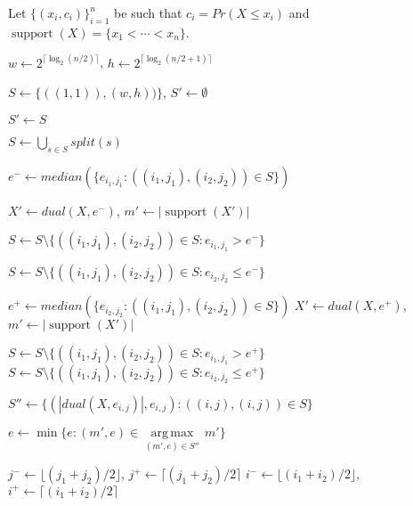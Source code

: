 \documentclass[letterpaper]{article} %
\DeclareMathOperator{\supp}{support}
\begin{document}
\begin{algorithm}
		\DontPrintSemicolon
		Let $\{(x_i, c_i)\}_{i=1}^n$ be such that $c_i=Pr(X \leq x_i)$ and $\supp(X)=\{x_1 < \cdots < x_n\}$.\;
		
		$w \gets 2^{\lceil \log_2(n/2) \rceil}$,
		$h \gets 2^{\lceil \log_2(n/2+1) \rceil}$ \;
				
		$S \gets  \{ ((1, 1)),(w,h)) \}$, $S' \gets \emptyset$\;
		
		
		{
			$S' \gets S$\;

			$S \gets \displaystyle \bigcup_{s \in S} split(s)$\;
			
			$e^- {\gets} median(\{ e_{i_1,j_1} \colon ((i_1,j_1),(i_2,j_2)) \in S \}) $\;		
			
			$X' \gets dual(X,e^-)$, $m' \gets |\supp(X')|$\;

			 {
				$S \gets S \setminus \{ ((i_1,j_1),(i_2,j_2)) {\in} S \colon e_{i_1,j_1} {>} e^- \}$ \;
			}
			
			\Else %
			{
				$S \gets S \setminus \{ ((i_1,j_1),(i_2,j_2)) {\in} S \colon e_{i_2,j_2} {\leq} e^- \}$ \;
			}
		
			$e^+ {\gets} median(\{ e_{i_2,j_2} \colon ((i_1,j_1),(i_2,j_2)) \in S \}) $\;
			$X' \gets dual(X,e^+)$, $m' \gets |\supp(X')|$\;

			 {
				$S \gets S \setminus \{ ((i_1,j_1),(i_2,j_2)) {\in} S \colon e_{i_1,j_1} {>} e^+ \}$ \;
			}
			\Else %
			{
				$S \gets S \setminus \{ ((i_1,j_1),(i_2,j_2)) {\in} S \colon e_{i_2,j_2} {\leq} e^+ \}$ \;
			}
			
		
		}
	
		$S'' \gets \{(|dual(X,e_{i,j})|,e_{i,j}) \colon ((i,j),(i,j)) \in S\}$\;	
	
		$e \gets \min\{e\colon (m',e) \in \underset{(m',e)\in S''}{\operatorname{arg\,max}}\, m'\}$\;

		\caption{$linApprox(X,m)$}   
		\label{alg:linear}
	\end{algorithm}

	\begin{procedure}
		\DontPrintSemicolon
		$j^- \gets \lfloor (j_1+j_2)/2 \rfloor$,
		$j^+ \gets \lceil (j_1+j_2)/2 \rceil$\;
		$i^- \gets \lfloor (i_1+i_2)/2 \rfloor$,
		$i^+ \gets \lceil (i_1+i_2)/2 \rceil$\;

		
		\caption{{$split(((i_1,j_1),(i_2,j_2)))$}()}
		\label{proc:split}
	\end{procedure}
	
\end{document}
